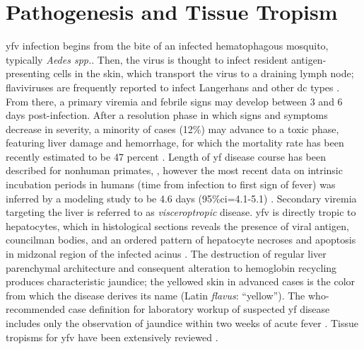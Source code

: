\section{Pathogenesis and Tissue Tropism}
\Gls{yfv} infection begins from the bite of an infected hematophagous mosquito, typically \emph{Aedes spp.}. Then, the virus is thought to infect resident antigen-presenting cells in the skin, which transport the virus to a draining lymph node; flaviviruses are frequently reported to infect Langerhans and other \gls{dc} types \parencite{Johnston:2000cf, Querec:2006kr, Wu:2000ew}. From there, a primary viremia and febrile signs may develop between 3 and 6 days post-infection. After a resolution phase in which signs and symptoms decrease in severity, a minority of cases (12\%) may advance to a toxic phase, featuring liver damage and hemorrhage, for which the mortality rate has been recently estimated to be 47 percent \parencite{Johansson:2014hv}. Length of \gls{yf} disease course has been described for nonhuman primates, \parencite{Monath:1981tc}, however the most recent data on intrinsic incubation periods in humans (time from infection to first sign of fever) was inferred by a modeling study to be 4.6 days (95\%\gls{ci}=4.1-5.1) \parencite{Johansson:2010ca}. Secondary viremia targeting the liver is referred to as \emph{visceroptropic} disease. \Gls{yfv} is directly tropic to hepatocytes, which in histological sections reveals the presence of viral antigen, councilman bodies, and an ordered pattern of hepatocyte necroses and apoptosis in midzonal region of the infected acinus \parencite{Quaresma:2006hu,Quaresma:2006jb}. The destruction of regular liver parenchymal architecture and consequent alteration to hemoglobin recycling produces characteristic jaundice; the yellowed skin in advanced cases is the color from which the disease derives its name (Latin \emph{flavus}: ``yellow''). The \Gls{who}-recommended case definition for laboratory workup of suspected \gls{yf} disease includes only the observation of jaundice within two weeks of acute fever \parencite{WorldHealthOrganization:2003tq}. Tissue tropisms for \gls{yfv} have been extensively reviewed \parencite{Vasconcelos:2015bp}. 

